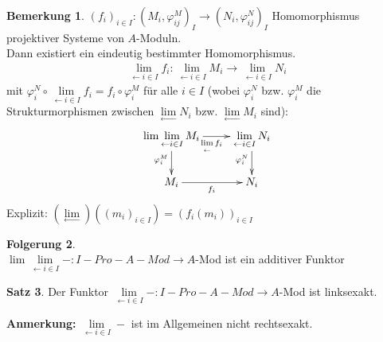 \documentclass[10pt,a4paper,numbers=endperiod]{scrreprt}
\theoremstyle{definition}
\newtheorem{satz}{Satz}[section]
\newtheorem{bem}[satz]{Bemerkung}
\newtheorem{folg}[satz]{Folgerung}
\begin{document}
\begin{bem}
	$(f_i)_{i \in I}: (M_i, \varphi_{ij}^M)_I \longrightarrow (N_i, \varphi_{ij}^N)_I$ Homomorphismus projektiver Systeme von $A$-Moduln.\\
	Dann existiert ein eindeutig bestimmter Homomorphismus. \begin{align*}
		\lim\limits_{\leftarrow i \in I} f_i: \lim\limits_{\leftarrow i \in I}	M_i \longrightarrow \lim\limits_{\leftarrow i \in I} N_i
	\end{align*}
	mit $\varphi_i^N \circ \lim\limits_{\leftarrow i \in I} f_i = f_i \circ \varphi_i^M$ für alle $i \in I$ (wobei $\varphi_i^N$ bzw. $\varphi_i^M$ die Strukturmorphismen zwischen $\lim\limits_{\leftarrow} N_i$ bzw. $\lim\limits_{\leftarrow} M_i$ sind): \begin{align*}
	\begin{xy}
	\xymatrix{
		\lim\lim\limits_{\leftarrow i \in I} M_i \ar[r]_{\lim\limits_{\leftarrow} f_i} \ar[d]_ {\varphi_i^M} & \lim\limits_{\leftarrow i \in I} N_i \ar[d]_{\varphi_i^N}\\
		M_i \ar[r]_{f_i} & N_i
	}
	\end{xy}
	\end{align*}
	Explizit: $(\lim\limits_{\leftarrow})((m_i)_{i \in I}) = (f_i(m_i))_{i \in I}$
\end{bem}

\begin{folg}
	$ $\\
	$\lim\lim\limits_{\leftarrow i \in I} -: I-Pro-A-Mod \longrightarrow A$-Mod ist ein additiver Funktor
\end{folg}

\begin{satz}
	Der Funktor $\lim\limits_{\leftarrow i \in I} -: I-Pro-A-Mod \longrightarrow A$-Mod ist linksexakt.
\end{satz}

\textbf{Anmerkung:} $\lim\limits_{\leftarrow i \in I}-$ ist im Allgemeinen nicht rechtsexakt.
\end{document}
